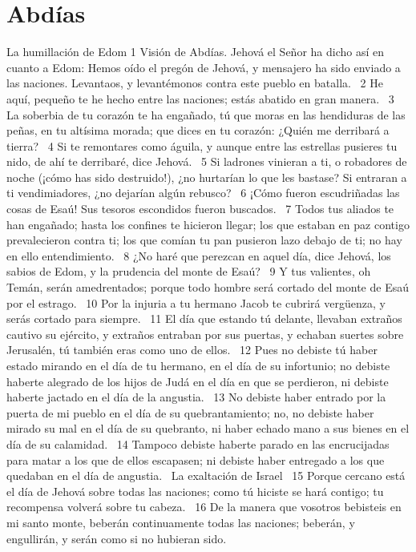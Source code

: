 \chapter{Abdías}


La humillación de Edom 
1 Visión de Abdías. Jehová el Señor ha dicho así en cuanto a Edom: Hemos oído el pregón de Jehová, y mensajero ha sido enviado a las naciones. Levantaos, y levantémonos contra este pueblo en batalla.  
2 He aquí, pequeño te he hecho entre las naciones; estás abatido en gran manera.  
3 La soberbia de tu corazón te ha engañado, tú que moras en las hendiduras de las peñas, en tu altísima morada; que dices en tu corazón: ¿Quién me derribará a tierra?  
4 Si te remontares como águila, y aunque entre las estrellas pusieres tu nido, de ahí te derribaré, dice Jehová.  
5 Si ladrones vinieran a ti, o robadores de noche (¡cómo has sido destruido!), ¿no hurtarían lo que les bastase? Si entraran a ti vendimiadores, ¿no dejarían algún rebusco?  
6 ¡Cómo fueron escudriñadas las cosas de Esaú! Sus tesoros escondidos fueron buscados.  
7 Todos tus aliados te han engañado; hasta los confines te hicieron llegar; los que estaban en paz contigo prevalecieron contra ti; los que comían tu pan pusieron lazo debajo de ti; no hay en ello entendimiento.  
8 ¿No haré que perezcan en aquel día, dice Jehová, los sabios de Edom, y la prudencia del monte de Esaú?  
9 Y tus valientes, oh Temán, serán amedrentados; porque todo hombre será cortado del monte de Esaú por el estrago.  
10 Por la injuria a tu hermano Jacob te cubrirá vergüenza, y serás cortado para siempre.  
11 El día que estando tú delante, llevaban extraños cautivo su ejército, y extraños entraban por sus puertas, y echaban suertes sobre Jerusalén, tú también eras como uno de ellos.  
12 Pues no debiste tú haber estado mirando en el día de tu hermano, en el día de su infortunio; no debiste haberte alegrado de los hijos de Judá en el día en que se perdieron, ni debiste haberte jactado en el día de la angustia.  
13 No debiste haber entrado por la puerta de mi pueblo en el día de su quebrantamiento; no, no debiste haber mirado su mal en el día de su quebranto, ni haber echado mano a sus bienes en el día de su calamidad.  
14 Tampoco debiste haberte parado en las encrucijadas para matar a los que de ellos escapasen; ni debiste haber entregado a los que quedaban en el día de angustia.  
La exaltación de Israel  
15 Porque cercano está el día de Jehová sobre todas las naciones; como tú hiciste se hará contigo; tu recompensa volverá sobre tu cabeza.  
16 De la manera que vosotros bebisteis en mi santo monte, beberán continuamente todas las naciones; beberán, y engullirán, y serán como si no hubieran sido.  
